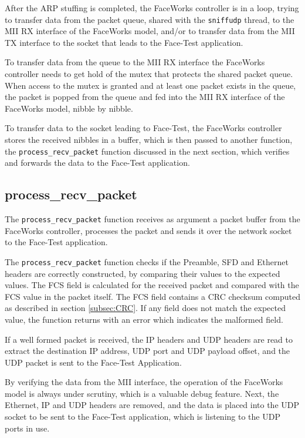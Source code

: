 \documentclass[defaultstyle,10pt,master,Helvetica]{thesis}
\begin{document}
After the \ac{ARP} stuffing is completed, the FaceWorks controller is in a loop, trying to transfer data from the packet queue, shared with the \texttt{sniffudp} thread, to the \ac{MII} RX interface of the FaceWorks model, and/or to transfer data from the \ac{MII} TX interface to the socket that leads to the Face-Test application.

To transfer data from the queue to the MII RX interface the FaceWorks controller needs to get hold of the mutex that protects the shared packet queue. When access to the mutex is granted and at least one packet exists in the queue, the packet is popped from the queue and fed into the \ac{MII} RX interface of the FaceWorks model, nibble by nibble.

To transfer data to the socket leading to Face-Test, the FaceWorks controller  stores the received nibbles in a buffer, which is then passed to another function, the \texttt{process\_recv\_packet} function discussed in the next section, which verifies and forwards the data to the Face-Test application.


\subsection{process\_recv\_packet}
\label{subsec:process_recv}

The \texttt{process\_recv\_packet} function receives as argument a packet buffer from the FaceWorks controller, processes the packet and sends it over the network socket to the Face-Test application.

The \texttt{process\_recv\_packet} function checks if the Preamble, \ac{SFD} and Ethernet headers are correctly constructed, by comparing their values to the expected values. The \ac{FCS} field is calculated for the received packet and compared with the \ac{FCS} value in the packet itself. The FCS field contains a \ac{CRC} checksum computed as described in section \ref{subsec:CRC}. If any field does not match the expected value, the function returns with an error which indicates the malformed field.

If a well formed packet is received, the \ac{IP} headers and \ac{UDP} headers are read to extract the destination \ac{IP} address, \ac{UDP} port and \ac{UDP} payload offset, and the \ac{UDP} packet is sent to the Face-Test Application.

By verifying the data from the \ac{MII} interface, the operation of the FaceWorks model is always under scrutiny, which is a valuable debug feature. Next, the Ethernet, \ac{IP} and \ac{UDP} headers are removed,  and the data is placed into the \ac{UDP} socket to be sent to the Face-Test application, which is listening to the UDP ports in use.
\end{document}
